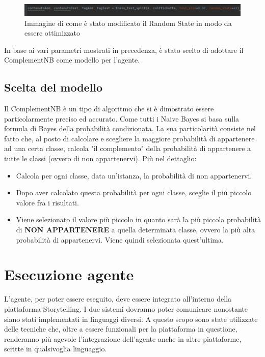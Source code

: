 \documentclass{report}
\begin{document}
    \begin{figure}[h]
            \centering
            \includegraphics[width =\textwidth]{immagini/randomState.png}
            \caption{Immagine di come è stato modificato il Random State in modo da essere ottimizzato}

    \end{figure}

    In base ai vari parametri mostrati in precedenza, è stato scelto di adottare il ComplementNB come modello per l'agente.
   
    
    \section{Scelta del modello}
    Il ComplementNB è un tipo di algoritmo che si è dimostrato essere particolarmente preciso ed accurato.
    Come tutti i Naive Bayes si basa sulla formula di Bayes della probabilità condizionata.
    La sua particolarità consiste nel fatto che, al posto di calcolare e scegliere la maggiore probabilità 
    di appartenere ad una certa classe, calcola "il complemento" della probabilità di appartenere a tutte
    le classi (ovvero di non appartenervi).
    \newline
    Più nel dettaglio:
    \begin{itemize}
        \item Calcola per ogni classe, data un'istanza, la probabilità di non appartenervi.
        \item Dopo aver calcolato questa probabilità per ogni classe, sceglie il più piccolo valore fra i risultati.
        \item Viene selezionato il valore più piccolo in quanto sarà la più piccola probabilità di {\bfseries NON APPARTENERE}
        a quella determinata classe, ovvero la più alta probabilità di appartenervi. Viene quindi selezionata quest'ultima.
    \end{itemize} 
    
    \chapter{Esecuzione agente}
    
    L'agente, per poter essere eseguito, deve essere integrato all'interno della piattaforma Storytelling.
    I due sistemi dovranno poter comunicare nonostante siano stati implementati in linguaggi diversi.
    \newline
    A questo scopo sono state utilizzate delle tecniche che, oltre a essere funzionali per la piattaforma in questione,
    renderanno più agevole l'integrazione dell'agente anche in altre piattaforme, scritte in qualsivoglia linguaggio.
\end{document}
